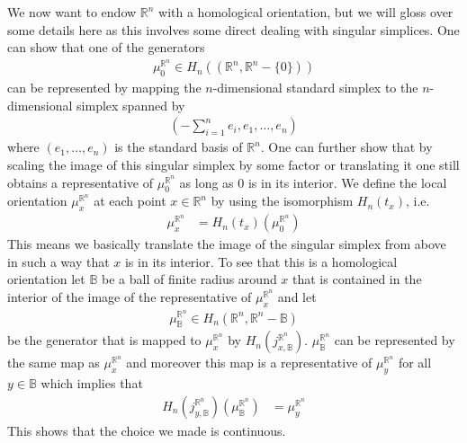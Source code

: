 \begin{exa}
\label{exa:homorrn}
We now want to endow $\mathbb{R}^{n}$ with a homological orientation, but we will gloss over some details here as this involves some direct dealing with singular simplices. One can show that one of the generators
\begin{align*}
  \mu_{0}^{\mathbb{R}^{n}}
  \in
  H_{n}((\mathbb{R}^{n},\mathbb{R}^{n} - \lbrace 0 \rbrace))
\end{align*}
can be represented by mapping the $n$-dimensional standard simplex to the $n$-dimensional simplex spanned by
\begin{align*}
  \left(
    -
    \sum_{i = 1}^{n}
    e_{i}
    ,
    e_{1}
    ,
    \ldots
    ,
    e_{n}
  \right)
\end{align*}
where $(e_{1},\ldots,e_{n})$ is the standard basis of $\mathbb{R}^{n}$. One can further show that by scaling the image of this singular simplex by some factor or translating it one still obtains a representative of $\mu_{0}^{\mathbb{R}^{n}}$ as long as $0$ is in its interior. We define the local orientation $\mu_{x}^{\mathbb{R}^{n}}$ at each point $x \in \mathbb{R}^{n}$ by using the isomorphism $H_{n}(t_{x})$, i.e.
\begin{align*}
  \mu_{x}^{\mathbb{R}^{n}}
  &=
  H_{n}(t_{x})(\mu_{0}^{\mathbb{R}^{n}})
\end{align*}
This means we basically translate the image of the singular simplex from above in such a way that $x$ is in its interior. To see that this is a homological orientation let $\mathbb{B}$ be a ball of finite radius around $x$ that is contained in the interior of the image of the representative of $\mu_{x}^{\mathbb{R}^{n}}$ and let
\begin{align*}
  \mu_{\mathbb{B}}^{\mathbb{R}^{n}}
  \in
  H_{n}(\mathbb{R}^{n},\mathbb{R}^{n} - \mathbb{B})
\end{align*}
be the generator that is mapped to $\mu_{x}^{\mathbb{R}^{n}}$ by $H_{n}(j_{x,\mathbb{B}}^{\mathbb{R}^{n}})$. $\mu_{\mathbb{B}}^{\mathbb{R}^{n}}$ can be represented by the same map as $\mu_{x}^{\mathbb{R}^{n}}$ and moreover this map is a representative of $\mu_{y}^{\mathbb{R}^{n}}$ for all $y \in \mathbb{B}$ which implies that
\begin{align*}
  H_{n}(j_{y,\mathbb{B}}^{\mathbb{R}^{n}})
  \left
    (\mu_{\mathbb{B}}^{\mathbb{R}^{n}}
  \right)
  &=
  \mu_{y}^{\mathbb{R}^{n}}
\end{align*}
This shows that the choice we made is continuous.
\end{exa}
